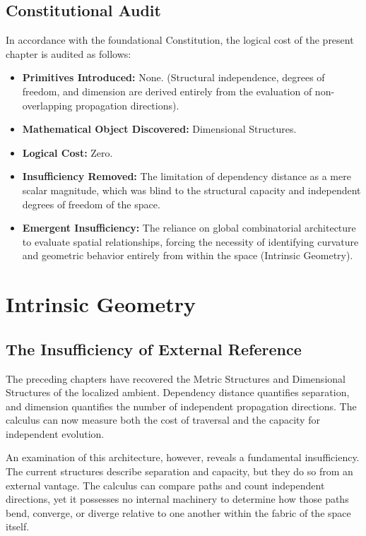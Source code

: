 \documentclass[12pt,anyside]{book}
\begin{document}
\section{Constitutional Audit}
In accordance with the foundational Constitution, the logical cost of the present chapter is audited as follows:
\begin{itemize}
    \item \textbf{Primitives Introduced:} None. (Structural independence, degrees of freedom, and dimension are derived entirely from the evaluation of non-overlapping propagation directions).
    \item \textbf{Mathematical Object Discovered:} Dimensional Structures.
    \item \textbf{Logical Cost:} Zero.
    \item \textbf{Insufficiency Removed:} The limitation of dependency distance as a mere scalar magnitude, which was blind to the structural capacity and independent degrees of freedom of the space.
    \item \textbf{Emergent Insufficiency:} The reliance on global combinatorial architecture to evaluate spatial relationships, forcing the necessity of identifying curvature and geometric behavior entirely from within the space (Intrinsic Geometry).
\end{itemize}

\chapter{Intrinsic Geometry}

\section{The Insufficiency of External Reference}
The preceding chapters have recovered the Metric Structures and Dimensional Structures of the localized ambient. Dependency distance quantifies separation, and dimension quantifies the number of independent propagation directions. The calculus can now measure both the cost of traversal and the capacity for independent evolution.

An examination of this architecture, however, reveals a fundamental insufficiency. The current structures describe separation and capacity, but they do so from an external vantage. The calculus can compare paths and count independent directions, yet it possesses no internal machinery to determine how those paths bend, converge, or diverge relative to one another within the fabric of the space itself. 
\end{document}
